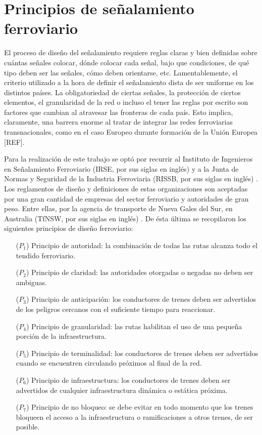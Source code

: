 \section{Principios de señalamiento ferroviario}
    \label{sec:principios}
    
    El proceso de diseño del señalamiento requiere reglas claras y bien definidas sobre cuántas señales colocar, dónde colocar cada señal, bajo que condiciones, de qué tipo deben ser las señales, cómo deben orientarse, etc. Lamentablemente, el criterio utilizado a la hora de definir el señalamiento dista de ser uniforme en los distintos países. La obligatoriedad de ciertas señales, la protección de ciertos elementos, el granularidad de la red o incluso el tener las reglas por escrito son factores que cambian al atravesar las fronteras de cada país. Esto implica, claramente, una barrera enorme al tratar de integrar las redes ferroviarias transnacionales, como en el caso Europeo durante formación de la Unión Europea [REF].
    
    Para la realización de este trabajo se optó por recurrir al Instituto de Ingenieros en Señalamiento Ferroviario (IRSE, por sus siglas en inglés) \cite{IRSE} y a la Junta de Normas y Seguridad de la Industria Ferroviaria (RISSB, por sus siglas en inglés) \cite{RISSB}. Los reglamentos de diseño y definiciones de estas organizaciones son aceptadas por una gran cantidad de empresas del sector ferroviario y autoridades de gran peso. Entre ellas, por la agencia de transporte de Nueva Gales del Sur, en Australia (TfNSW, por sus siglas en inglés) \cite{TFNSW}. De ésta última se recopilaron los siguientes principios de diseño ferroviario:
    
    \begin{itemize}
        \item [($P_1$)] Principio de autoridad: la combinación de todas las rutas alcanza todo el tendido ferroviario.
        \item [($P_2$)] Principio de claridad: las autoridades otorgadas o negadas no deben ser ambiguas. 
        \item [($P_3$)] Principio de anticipación: los conductores de trenes deben ser advertidos de los peligros cercanos con el suficiente tiempo para reaccionar.
        \item [($P_4$)] Principio de granularidad: las rutas habilitan el uso de una pequeña porción de la infraestructura.
        \item [($P_5$)] Principio de terminalidad: los conductores de trenes deben ser advertidos cuando se encuentren circulando próximos al final de la red.
        \item [($P_6$)] Principio de infraestructura: los conductores de trenes deben ser advertidos de cualquier infraestructura dinámica o estática próxima.
        \item [($P_7$)] Principio de no bloqueo: se debe evitar en todo momento que los trenes bloqueen el acceso a la infraestructura o ramificaciones a otros trenes, de ser posible.
    \end{itemize}

